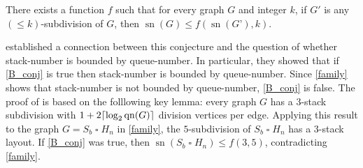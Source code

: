 \documentclass[kpfonts]{patmorin}
\DeclareMathOperator{\sn}{sn}
\DeclareMathOperator{\qn}{qn}
\renewcommand{\leq}{\leqslant}
\newcommand{\CartProd}{\mathbin{\square}}
\begin{document}
\begin{conj}[\citep{BO99}]
\label{B_conj}
There exists a function $f$ such that for every graph $G$ and integer $k$, if $G'$ is any $(\leq k)$-subdivision of $G$, then $\sn(G) \leq f(\sn(G’),k)$.
\end{conj}

\citet{DujWoo05} established a connection between this conjecture and the question of whether stack-number is bounded by queue-number. In particular, they showed that if
\cref{B_conj} is true then stack-number is bounded by queue-number. Since \cref{family} shows that stack-number is not bounded by queue-number, \cref{B_conj} is false. The proof of \citet{DujWoo05} is based on the folllowing key lemma: every graph $G$ has a $3$-stack subdivision with $1+2 \ceil{\log_2\qn(G)}$ division vertices per edge. Applying this result to the graph $G=S_b\CartProd H_n$ in \cref{family},
the $5$-subdivision of $S_b\CartProd H_n$ has a $3$-stack layout. If \cref{B_conj} was true, then $\sn(S_b\CartProd H_n) \leq f( 3,5)$, contradicting \cref{family}.






\end{document}

